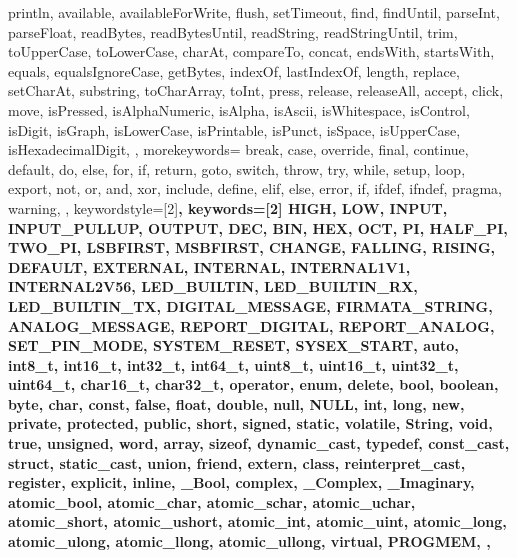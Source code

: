 {{                println, available, availableForWrite, flush, setTimeout, find, 
                findUntil, parseInt, parseFloat, readBytes, readBytesUntil, readString, 
                readStringUntil, trim, toUpperCase, toLowerCase, charAt, compareTo, 
                concat, endsWith, startsWith, equals, equalsIgnoreCase, getBytes, 
                indexOf, lastIndexOf, length, replace, setCharAt, substring, 
                toCharArray, toInt, press, release, releaseAll, accept, click, move, 
                isPressed, isAlphaNumeric, isAlpha, isAscii, isWhitespace, isControl, 
                isDigit, isGraph, isLowerCase, isPrintable, isPunct, isSpace, 
                isUpperCase, isHexadecimalDigit, 
                }, 
  morekeywords={   %
                break, case, override, final, continue, default, do, else, for, 
                if, return, goto, switch, throw, try, while, setup, loop, export, 
                not, or, and, xor, include, define, elif, else, error, if, ifdef, 
                ifndef, pragma, warning,
                }, 
% 
%
  keywordstyle=[2]\bfseries\color{arduinoBlue},   
  keywords=[2]{   %
                HIGH, LOW, INPUT, INPUT_PULLUP, OUTPUT, DEC, BIN, HEX, OCT, PI, 
                HALF_PI, TWO_PI, LSBFIRST, MSBFIRST, CHANGE, FALLING, RISING, 
                DEFAULT, EXTERNAL, INTERNAL, INTERNAL1V1, INTERNAL2V56, LED_BUILTIN, 
                LED_BUILTIN_RX, LED_BUILTIN_TX, DIGITAL_MESSAGE, FIRMATA_STRING, 
                ANALOG_MESSAGE, REPORT_DIGITAL, REPORT_ANALOG, SET_PIN_MODE, 
                SYSTEM_RESET, SYSEX_START, auto, int8_t, int16_t, int32_t, int64_t, 
                uint8_t, uint16_t, uint32_t, uint64_t, char16_t, char32_t, operator, 
                enum, delete, bool, boolean, byte, char, const, false, float, double, 
                null, NULL, int, long, new, private, protected, public, short, 
                signed, static, volatile, String, void, true, unsigned, word, array, 
                sizeof, dynamic_cast, typedef, const_cast, struct, static_cast, union, 
                friend, extern, class, reinterpret_cast, register, explicit, inline, 
                _Bool, complex, _Complex, _Imaginary, atomic_bool, atomic_char, 
                atomic_schar, atomic_uchar, atomic_short, atomic_ushort, atomic_int, 
                atomic_uint, atomic_long, atomic_ulong, atomic_llong, atomic_ullong, 
                virtual, PROGMEM,
                },  
% 
%
}

